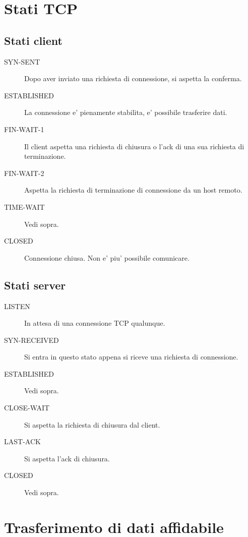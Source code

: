 \section{Stati TCP}
\subsection{Stati client}
\begin{description}
    \item[SYN-SENT] Dopo aver inviato una richiesta di connessione, si aspetta la conferma.
    \item[ESTABLISHED] La connessione e' pienamente stabilita, e' possibile trasferire dati.
    \item[FIN-WAIT-1] Il client aspetta una richiesta di chiusura o l'ack di una sua richiesta di terminazione.
    \item[FIN-WAIT-2] Aspetta la richiesta di terminazione di connessione da un host remoto. 
    \item[TIME-WAIT] Vedi sopra.
    \item[CLOSED] Connessione chiusa. Non e' piu' possibile comunicare.
\end{description}
\subsection{Stati server}
\begin{description}
    \item[LISTEN] In attesa di una connessione TCP qualunque.
    \item[SYN-RECEIVED] Si entra in questo stato appena si riceve una richiesta di connessione.
    \item[ESTABLISHED] Vedi sopra.
    \item[CLOSE-WAIT] Si aspetta la richiesta di chiusura dal client.
    \item[LAST-ACK] Si aspetta l'ack di chiusura.
    \item[CLOSED] Vedi sopra.
\end{description}
\newpage
\section{Trasferimento di dati affidabile}
